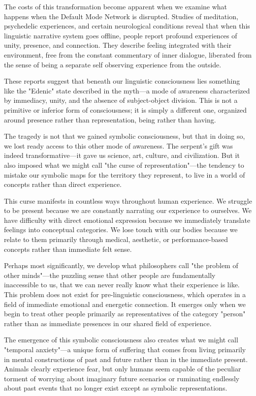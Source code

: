 The costs of this transformation become apparent when we examine what happens when the Default Mode Network is disrupted. Studies of meditation, psychedelic experiences, and certain neurological conditions reveal that when this linguistic narrative system goes offline, people report profound experiences of unity, presence, and connection. They describe feeling integrated with their environment, free from the constant commentary of inner dialogue, liberated from the sense of being a separate self observing experience from the outside.

These reports suggest that beneath our linguistic consciousness lies something like the "Edenic" state described in the myth—a mode of awareness characterized by immediacy, unity, and the absence of subject-object division. This is not a primitive or inferior form of consciousness; it is simply a different one, organized around presence rather than representation, being rather than having.

The tragedy is not that we gained symbolic consciousness, but that in doing so, we lost ready access to this other mode of awareness. The serpent's gift was indeed transformative—it gave us science, art, culture, and civilization. But it also imposed what we might call "the curse of representation"—the tendency to mistake our symbolic maps for the territory they represent, to live in a world of concepts rather than direct experience.

This curse manifests in countless ways throughout human experience. We struggle to be present because we are constantly narrating our experience to ourselves. We have difficulty with direct emotional expression because we immediately translate feelings into conceptual categories. We lose touch with our bodies because we relate to them primarily through medical, aesthetic, or performance-based concepts rather than immediate felt sense.

Perhaps most significantly, we develop what philosophers call "the problem of other minds"—the puzzling sense that other people are fundamentally inaccessible to us, that we can never really know what their experience is like. This problem does not exist for pre-linguistic consciousness, which operates in a field of immediate emotional and energetic connection. It emerges only when we begin to treat other people primarily as representatives of the category "person" rather than as immediate presences in our shared field of experience.

The emergence of this symbolic consciousness also creates what we might call "temporal anxiety"—a unique form of suffering that comes from living primarily in mental constructions of past and future rather than in the immediate present. Animals clearly experience fear, but only humans seem capable of the peculiar torment of worrying about imaginary future scenarios or ruminating endlessly about past events that no longer exist except as symbolic representations.

